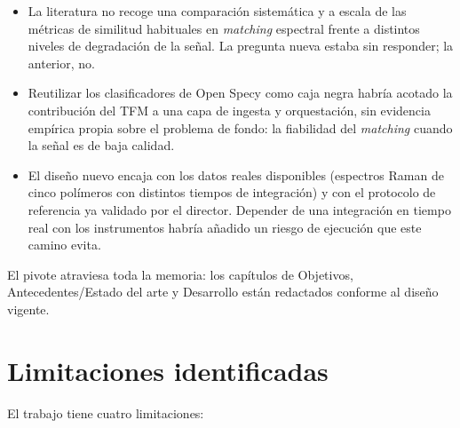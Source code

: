 \begin{itemize}
    \item La literatura no recoge una comparación sistemática y a escala de las métricas de similitud habituales en \textit{matching} espectral frente a distintos niveles de degradación de la señal. La pregunta nueva estaba sin responder; la anterior, no.
    \item Reutilizar los clasificadores de Open Specy como caja negra habría acotado la contribución del TFM a una capa de ingesta y orquestación, sin evidencia empírica propia sobre el problema de fondo: la fiabilidad del \textit{matching} cuando la señal es de baja calidad.
    \item El diseño nuevo encaja con los datos reales disponibles (espectros Raman de cinco polímeros con distintos tiempos de integración) y con el protocolo de referencia ya validado por el director. Depender de una integración en tiempo real con los instrumentos habría añadido un riesgo de ejecución que este camino evita.
\end{itemize}

El pivote atraviesa toda la memoria: los capítulos de Objetivos, Antecedentes/Estado del arte y Desarrollo están redactados conforme al diseño vigente.

\section{Limitaciones identificadas}

El trabajo tiene cuatro limitaciones:


